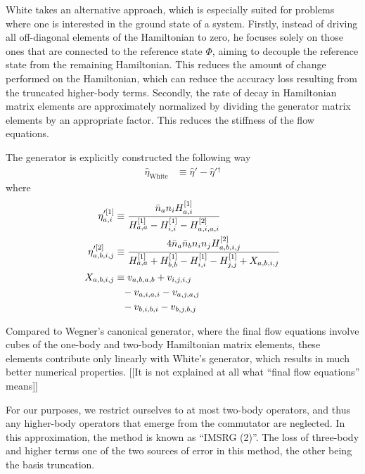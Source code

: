 \documentclass[amsmath, amssymb, aps, floatfix, nofootinbib, preprintnumbers,showpacs, superscriptaddress, twocolumn]{revtex4-1}
\begin{document}
White takes an alternative approach, which is especially suited for problems where one is interested in the ground state of a system.  Firstly, instead of driving all off-diagonal elements of the Hamiltonian to zero, he focuses solely on those ones that are connected to the reference state $\Phi$, aiming to decouple the reference state from the remaining Hamiltonian.  This reduces the amount of change performed on the Hamiltonian, which can reduce the accuracy loss resulting from the truncated higher-body terms.  Secondly, the rate of decay in Hamiltonian matrix elements are approximately normalized by dividing the generator matrix elements by an appropriate factor.  This reduces the stiffness of the flow equations.

The generator is explicitly constructed the following way \cite{PhysRevLett.106.222502,White:cond-mat0201346}
\begin{align}
\hat{\eta}_{\text{White}} &\equiv \hat{\eta}' - \hat{\eta}'{}^\dagger
\end{align}
where
\begin{align}
\eta^{\prime [1]}_{a, i} &\equiv \frac{\bar{n}_a n_i H^{[1]}_{a, i}}{H^{[1]}_{a, a} - H^{[1]}_{i, i} - H^{[2]}_{a, i, a, i}}
\label{eq:WhiteFull1} \\
\eta^{\prime [2]}_{a, b, i, j} &\equiv \frac{4 \bar{n}_a \bar{n}_b n_i n_j H^{[2]}_{a, b, i, j}}{H^{[1]}_{a, a} + H^{[1]}_{b, b} - H^{[1]}_{i, i} - H^{[1]}_{j, j} + X_{a, b, i, j}}
\label{eq:WhiteFull2} \\
X_{a, b, i, j}
  &\equiv v_{a, b, a, b} + v_{i, j, i, j} \notag \\
  &\hphantom{\equiv} - v_{a, i, a, i} - v_{a, j, a, j} \notag \\
  &\hphantom{\equiv} - v_{b, i, b, i} - v_{b, j, b, j}
\label{eq:White7}
\end{align}

Compared to Wegner's canonical generator, where the final flow equations involve cubes of the one-body and two-body Hamiltonian matrix elements, these elements contribute only linearly with White's generator, which results in much better numerical properties.  [[It is not explained at all what ``final flow equations'' means]]



For our purposes, we restrict ourselves to at most two-body operators, and
thus any higher-body operators that emerge from the commutator are neglected.
In this approximation, the method is known as ``IMSRG (2)''.  The loss of
three-body and higher terms one of the two sources of error in this method,
the other being the basis truncation.
\end{document}

